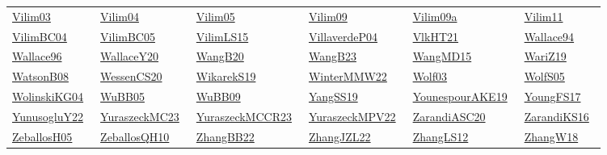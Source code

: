\begin{longtable}{*{6}{l}}
\href{works/Vilim03.pdf}{Vilim03}~\cite{Vilim03} & \href{works/Vilim04.pdf}{Vilim04}~\cite{Vilim04} & \href{works/Vilim05.pdf}{Vilim05}~\cite{Vilim05} & \href{works/Vilim09.pdf}{Vilim09}~\cite{Vilim09} & \href{works/Vilim09a.pdf}{Vilim09a}~\cite{Vilim09a} & \href{works/Vilim11.pdf}{Vilim11}~\cite{Vilim11}\\ 
\href{works/VilimBC04.pdf}{VilimBC04}~\cite{VilimBC04} & \href{works/VilimBC05.pdf}{VilimBC05}~\cite{VilimBC05} & \href{works/VilimLS15.pdf}{VilimLS15}~\cite{VilimLS15} & \href{}{VillaverdeP04}~\cite{VillaverdeP04} & \href{works/VlkHT21.pdf}{VlkHT21}~\cite{VlkHT21} & \href{}{Wallace94}~\cite{Wallace94}\\ 
\href{works/Wallace96.pdf}{Wallace96}~\cite{Wallace96} & \href{works/WallaceY20.pdf}{WallaceY20}~\cite{WallaceY20} & \href{works/WangB20.pdf}{WangB20}~\cite{WangB20} & \href{works/WangB23.pdf}{WangB23}~\cite{WangB23} & \href{works/WangMD15.pdf}{WangMD15}~\cite{WangMD15} & \href{}{WariZ19}~\cite{WariZ19}\\ 
\href{works/WatsonB08.pdf}{WatsonB08}~\cite{WatsonB08} & \href{works/WessenCS20.pdf}{WessenCS20}~\cite{WessenCS20} & \href{works/WikarekS19.pdf}{WikarekS19}~\cite{WikarekS19} & \href{works/WinterMMW22.pdf}{WinterMMW22}~\cite{WinterMMW22} & \href{works/Wolf03.pdf}{Wolf03}~\cite{Wolf03} & \href{works/WolfS05.pdf}{WolfS05}~\cite{WolfS05}\\ 
\href{works/WolinskiKG04.pdf}{WolinskiKG04}~\cite{WolinskiKG04} & \href{works/WuBB05.pdf}{WuBB05}~\cite{WuBB05} & \href{}{WuBB09}~\cite{WuBB09} & \href{works/YangSS19.pdf}{YangSS19}~\cite{YangSS19} & \href{works/YounespourAKE19.pdf}{YounespourAKE19}~\cite{YounespourAKE19} & \href{works/YoungFS17.pdf}{YoungFS17}~\cite{YoungFS17}\\ 
\href{works/YunusogluY22.pdf}{YunusogluY22}~\cite{YunusogluY22} & \href{works/YuraszeckMC23.pdf}{YuraszeckMC23}~\cite{YuraszeckMC23} & \href{works/YuraszeckMCCR23.pdf}{YuraszeckMCCR23}~\cite{YuraszeckMCCR23} & \href{works/YuraszeckMPV22.pdf}{YuraszeckMPV22}~\cite{YuraszeckMPV22} & \href{works/ZarandiASC20.pdf}{ZarandiASC20}~\cite{ZarandiASC20} & \href{works/ZarandiKS16.pdf}{ZarandiKS16}~\cite{ZarandiKS16}\\ 
\href{works/ZeballosH05.pdf}{ZeballosH05}~\cite{ZeballosH05} & \href{works/ZeballosQH10.pdf}{ZeballosQH10}~\cite{ZeballosQH10} & \href{works/ZhangBB22.pdf}{ZhangBB22}~\cite{ZhangBB22} & \href{works/ZhangJZL22.pdf}{ZhangJZL22}~\cite{ZhangJZL22} & \href{works/ZhangLS12.pdf}{ZhangLS12}~\cite{ZhangLS12} & \href{works/ZhangW18.pdf}{ZhangW18}~\cite{ZhangW18}\\ 

\end{longtable}
